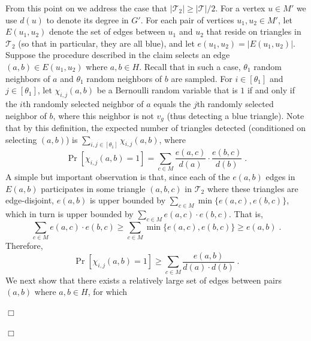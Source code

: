 \documentclass{article}
\newcommand{\calT}{{\mathcal{T}}}
\newenvironment{proof}{\smallskip\noindent{\bf Proof:}}%
        {\hspace*{\fill}$\Box$\par}
\newcommand{\commentt}[1]{ {}}
\begin{document}
\begin{proof}
\begin{proof}
From this point on we address the case that $|\calT_2| \geq |\calT|/2$. 
For a vertex $u\in M'$ we use $d(u)$ to denote its degree in $G'$. %
For each pair of vertices $u_1,u_2\in M'$, let $E(u_1,u_2)$ denote the set of edges between $u_1$ and $u_2$ that reside on triangles in $\calT_2$ (so that in particular, they are all blue), and let  $e(u_1,u_2) = |E(u_1,u_2)|$. 
Suppose the procedure described in the claim selects an edge $(a,b)\in E(u_1,u_2)$ where $a,b\in H$. Recall that in such a case, $\theta_1$ random neighbors of $a$ and $\theta_1$ random neighbors of $b$ are sampled.
For $i \in [\theta_1]$ and $j\in [\theta_1]$, let $\chi_{i,j}(a,b)$ be a Bernoulli random variable that is $1$ if and only if the $i$th randomly selected neighbor of $a$ equals the $j$th randomly selected neighbor of $b$, where this neighbor is not $v_g$ (thus detecting a blue triangle).
Note that by this definition, the expected number of triangles detected (conditioned on  selecting $(a,b)$) is
$\sum_{i,j\in [\theta_1]}\chi_{i,j}(a,b)$,
where
\begin{equation}\label{eq:a-b-c-1}
    \Pr[\chi_{i,j}(a,b)=1]= \sum_{c\in M}\frac{e(a,c)}{d(a)}\cdot \frac{e(b,c)}{d(b)}\;.
\end{equation}
A simple but important observation is that, since each of the $e(a,b)$ edges in $E(a,b)$ participates in some triangle $(a,b,c)$ in $\calT_2$ where these triangles are edge-disjoint, $e(a,b)$ is upper bounded by
$\sum_{c \in M} \min\{e(a,c),e(b,c)\}$, which in turn is upper bounded by
$\sum_{c\in M} e(a,c)\cdot e(b,c)$. 
That is, 
$$\sum_{c\in M} e(a,c)\cdot e(b,c)\geq \sum_{c \in M} \min\{e(a,c),e(b,c)\} \geq e(a,b)\;.$$
Therefore,
\begin{equation}\label{eq:a-b-c-2}
    \Pr[\chi_{i,j}(a,b)=1] \geq \sum_{c\in M}\frac{e(a,b)}{d(a)\cdot d(b)}\;.
\end{equation}
We next show that there exists a relatively large set of edges between  pairs $(a,b)$ where $a,b \in H$, for which

\end{proof}
\end{proof}
\end{document}
